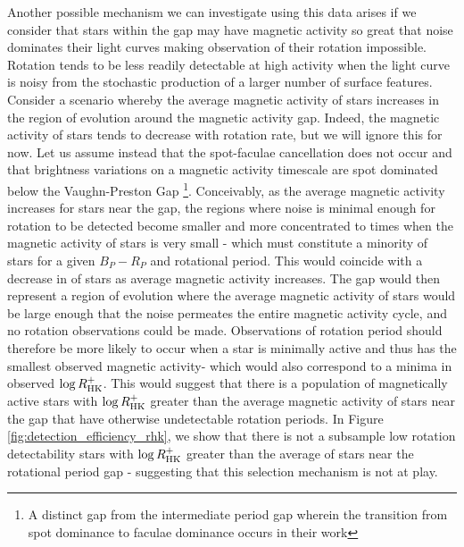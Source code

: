 Another possible mechanism we can investigate using this data arises if we consider that stars within the gap may have magnetic activity so great that noise dominates their light curves making observation of their rotation impossible.
Rotation tends to be less readily detectable at high activity when the light curve is noisy from the stochastic production of a larger number of surface features.
Consider a scenario whereby the average magnetic activity of stars increases in the region of evolution around the magnetic activity gap. 
Indeed, the magnetic activity of stars tends to decrease with rotation rate, but we will ignore this for now.
Let us assume instead that the spot-faculae cancellation does not occur and that brightness variations on a magnetic activity timescale are spot dominated below the Vaughn-Preston Gap \footnote{A distinct gap from the intermediate period gap wherein the transition from spot dominance to faculae dominance occurs in their work}.
Conceivably, as the average magnetic activity increases for stars near the gap, the regions where noise is minimal enough for rotation to be detected become smaller and more concentrated to times when the magnetic activity of stars is very small - which must constitute a minority of stars for a given $B_P-R_P$ and rotational period.
This would coincide with a decrease in \rper{} of stars as average magnetic activity increases.
The gap would then represent a region of evolution where the average magnetic activity of stars would be large enough that the noise permeates the entire magnetic activity cycle, and no rotation observations could be made.
Observations of rotation period should therefore be more likely to occur when a star is minimally active and thus has the smallest observed magnetic activity- which would also correspond to a minima in observed $\log R^{+}_{\rm{HK}}$.
This would suggest that there is a population of magnetically active stars with $\log R^{+}_{\rm{HK}}$ greater than the average magnetic activity of stars near the gap that have otherwise undetectable rotation periods.
In Figure \ref{fig:detection_efficiency_rhk}, we show that there is not a subsample low rotation detectability stars with $\log R^{+}_{\rm{HK}}$ greater than the average of stars near the rotational period gap - suggesting that this selection mechanism is not at play.

